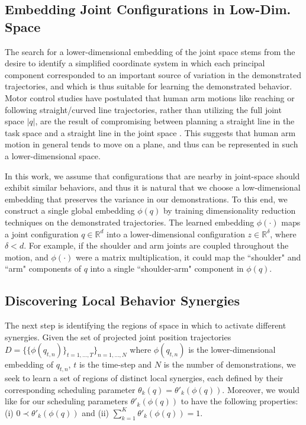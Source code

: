 \documentclass[letterpaper, 10 pt, conference,fleqn]{ieeeconf}
\begin{document}
\subsection{Embedding Joint Configurations in Low-Dim. Space}
The search for a lower-dimensional embedding of the joint space stems from the desire to identify a simplified coordinate system in which each principal component corresponded to an important source of variation in the demonstrated trajectories, and which is thus suitable for learning the demonstrated behavior. Motor control studies have postulated that human arm motions like reaching or following straight/curved line trajectories, rather than utilizing the full joint space $|q|$, are the result of compromising between planning a straight line in the task space and a straight line in the joint space \cite{Cruse1987humanarm,Okadome1999arm}. This suggests that human arm motion in general tends to move on a plane, and thus can be represented in such a lower-dimensional space. 

In this work, we assume that configurations that are nearby in joint-space should exhibit similar behaviors, and thus it is natural that we choose a low-dimensional embedding that preserves the variance in our demonstrations. To this end, we construct a single global embedding $\phi(q)$ by training dimensionality reduction techniques on the demonstrated trajectories. The learned embedding $\phi(\cdot)$ maps a joint configuration $q \in \mathbb{R}^d$ into a lower-dimensional configuration $z \in \mathbb{R}^\delta$, where $\delta < d$. For example, if the shoulder and arm joints are coupled throughout the motion, and $\phi(\cdot)$ were a matrix multiplication, it could map the ``shoulder" and ``arm" components of $q$ into a single ``shoulder-arm" component in $\phi(q)$.

\nocite{*}

\subsection{Discovering Local Behavior Synergies}
The next step is identifying the regions of space in which to activate different synergies. Given the set of projected joint position trajectories $D=\{\{\phi(q_{t,n})\}_{t=1,\dots, T}\}_{n=1,\dots,N}$ where $\phi(q_{t,n})$ is the lower-dimensional embedding of $q_{t,n}$, $t$ is the time-step and $N$ is the number of demonstrations, we seek to learn a set of regions of distinct local synergies, each defined by their corresponding scheduling parameter $\theta_k(q) = \theta'_k(\phi(q))$. Moreover, we would like for our scheduling parameters $\theta'_k(\phi(q))$ to have the following properties: (i) $0 \prec \theta'_k(\phi(q))$ and (ii) $\sum_{k=1}^{K}\theta'_k(\phi(q)) = 1$.
 
\end{document}
